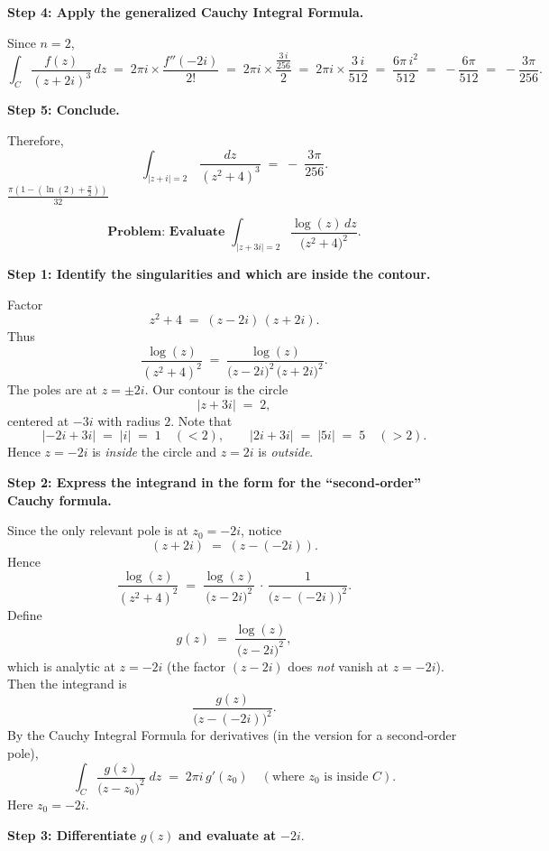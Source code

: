 \documentclass[12pt]{article}
\theoremstyle{definition} %
\theoremstyle{plain} %
\begin{document}
\textbf{Step 4: Apply the generalized Cauchy Integral Formula.}

Since \(n=2\),
\[
\int_C \frac{f(z)}{(z + 2i)^3}\,dz
\;=\;
2\pi i \times \frac{f''(-2i)}{2!}
\;=\;
2\pi i \times \frac{\tfrac{3\,i}{256}}{2}
\;=\;
2\pi i \times \frac{3\,i}{512}
\;=\;
\frac{6\pi\,i^2}{512}
\;=\;
-\frac{6\pi}{512}
\;=\;
-\frac{3\pi}{256}.
\]

\textbf{Step 5: Conclude.}

Therefore,
\[
\boxed{
\int_{\lvert z + i\rvert=2}\,\frac{dz}{(z^2 + 4)^3}
\;=\;
-\;\frac{3\pi}{256}.
}
\]
$\frac{\pi(1-(\ln(2)+\frac{\pi}{2}))}{32}$ 

\[
\textbf{Problem: Evaluate } \int_{\lvert z + 3i\rvert=2}
   \frac{\log(z)\,dz}{\bigl(z^{2}+4\bigr)^{2}}.
\]

\textbf{Step 1: Identify the singularities and which are inside the contour.}

Factor
\[
z^{2} + 4 \;=\;(z - 2i)\,(z + 2i).
\]
Thus
\[
\frac{\log(z)}{(z^{2}+4)^{2}}
\;=\;
\frac{\log(z)}{\bigl(z - 2i\bigr)^{2}\,\bigl(z + 2i\bigr)^{2}}.
\]
The poles are at \(z = \pm 2i\).  Our contour is the circle
\[
\lvert z + 3i\rvert \;=\; 2,
\]
centered at \(-3i\) with radius \(2\).  Note that
\[
\lvert -2i + 3i\rvert 
\;=\;\lvert i\rvert 
\;=\;1 
\quad(< 2),
\qquad
\lvert 2i + 3i\rvert 
\;=\;\lvert 5i\rvert 
\;=\;5 
\quad(> 2).
\]
Hence \(z = -2i\) is \emph{inside} the circle and \(z = 2i\) is \emph{outside}.

\textbf{Step 2: Express the integrand in the form for the ``second‐order'' Cauchy formula.}

Since the only relevant pole is at \(z_0 = -2i\), notice
\[
(z+2i) \;=\;(z - (-2i)).
\]
Hence
\[
\frac{\log(z)}{(z^{2}+4)^{2}}
\;=\;
\frac{\log(z)}{\bigl(z - 2i\bigr)^{2}}\,\cdot\,\frac{1}{\bigl(z - (-2i)\bigr)^{2}}.
\]
Define
\[
g(z)
\;=\;
\frac{\log(z)}{\bigl(z - 2i\bigr)^{2}},
\]
which is analytic at \(z=-2i\) (the factor \((z-2i)\) does \emph{not} vanish at \(z=-2i\)).  Then the integrand is
\[
\frac{g(z)}{\bigl(z - (-2i)\bigr)^{2}}.
\]
By the Cauchy Integral Formula for derivatives (in the version for a second‐order pole),
\[
\int_{C}
  \frac{g(z)}{\bigl(z - z_0\bigr)^{2}}\;dz
\;=\;
2\pi i \, g'(z_0)
\quad
(\text{where }z_0 \text{ is inside }C).
\]
Here \(z_0 = -2i\).

\textbf{Step 3: Differentiate } \(g(z)\) \textbf{ and evaluate at } \(-2i\).
\end{document}
